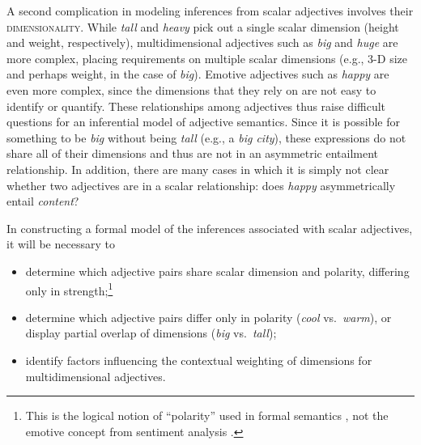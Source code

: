 \documentclass[10pt]{article}
\begin{document}
\vspace{-0.5em}
\vspace{-0.5em}



A second complication in modeling inferences from scalar adjectives involves their \textsc{dimensionality}. While \emph{tall} and \emph{heavy} pick out a single scalar dimension (height and weight, respectively), multidimensional adjectives such as \emph{big} and \emph{huge} are more complex, placing requirements on multiple scalar dimensions (e.g., 3-D size and perhaps weight, in the case of \emph{big}). Emotive adjectives such as \emph{happy} are even more complex, since the dimensions that they rely on are not easy to identify or quantify. These relationships among adjectives thus raise difficult questions for an inferential model of adjective semantics. Since it is possible for something to be \emph{big} without being \emph{tall} (e.g., a \emph{big city}), these expressions do not share all of their dimensions and thus are not in an asymmetric entailment relationship. In addition, there are many cases in which it is simply not clear whether two adjectives are in a scalar relationship: does \emph{happy} asymmetrically entail \emph{content}? 

In constructing a formal model of the inferences associated with scalar adjectives, it will be necessary to 
 \vspace{-.25in}
\begin{itemize}
\item [1.] determine which adjective pairs share scalar dimension and polarity, differing only in strength;\footnote{\label{polarity}This is the logical notion of ``polarity'' used in formal semantics \cite{kennedy2001polar}, not the emotive concept from sentiment analysis \cite{wilson2009recognizing,williams2009predicting}.}
\item [2.] determine which adjective pairs differ only in polarity (\emph{cool} vs.\ \emph{warm}), or display partial overlap of dimensions (\emph{big} vs.\ \emph{tall});
\item [3.] identify factors influencing the contextual weighting of dimensions for multidimensional adjectives.\end{itemize}
 \vspace{-.05in}
\end{document}
